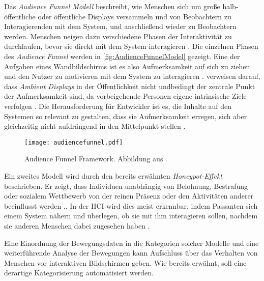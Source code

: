 Das \emph{Audience Funnel Modell} \citep{wouters_uncovering_2016, mai_audience_2018} beschreibt,
wie Menschen sich um große halb-öffentliche oder öffentliche Displays versammeln
und von Beobachtern zu Interagierenden mit dem System, und anschließend wieder zu Beobachtern werden.
Menschen neigen dazu verschiedene Phasen der Interaktivität zu durchlaufen,
bevor sie direkt mit dem System interagieren \citep{wouters_uncovering_2016, mai_audience_2018}.
Die einzelnen Phasen des \emph{Audience Funnel} werden in \autoref{fig:AudienceFunnelModel} gezeigt.
Eine der Aufgaben eines Wandbildschirms ist es also Aufmerksamkeit auf sich zu ziehen
und den Nutzer zu motivieren mit dem System zu interagieren \citep{mai_audience_2018}.
\citet{mai_audience_2018} verweisen darauf, dass \emph{Ambient Displays} in der Öffentlichkeit
nicht undbedingt der zentrale Punkt der Aufmerksamkeit sind, da vorbeigehende Personen eigene intrinsische Ziele verfolgen \citep{mai_audience_2018}.
Die Herausforderung für Entwickler ist es, die Inhalte auf den Systemen so relevant zu gestalten,
dass sie Aufmerksamkeit erregen, sich aber gleichzeitig nicht aufdrängend in den Mittelpunkt stellen \citep{mai_audience_2018}.
\begin{figure}[ht]
    \begin{center}
    \texttt{[image: audiencefunnel.pdf]}
    \end{center}
    \caption{Audience Funnel Framework. Abbildung aus \citet{mai_audience_2018}.}
    \label{fig:AudienceFunnelModel}
  \end{figure}

Ein zweites Modell wird durch den bereits erwähnten \emph{Honeypot-Effekt} beschrieben.
Er zeigt, dass Individuen unabhängig von Belohnung, Bestrafung oder sozialem Wettbewerb
von der reinen Präsenz oder den Aktivitäten anderer beeinflusst werden \citep{wouters_uncovering_2016}..
In der \ac{HCI} wird dies meist erkennbar, indem Passanten sich einem System nähern
und überlegen, ob sie mit ihm interagieren sollen,
nachdem sie anderen Menschen dabei zugesehen haben \citep{wouters_uncovering_2016}.

Eine Einordnung der Bewegungsdaten in die Kategorien solcher Modelle
und eine weiterführende Analyse der Bewegungen kann Aufschluss über das Verhalten von Menschen
vor interaktiven Bildschirmen geben.
Wie bereits erwähnt, soll eine derartige Kategorisierung automatisiert werden.

